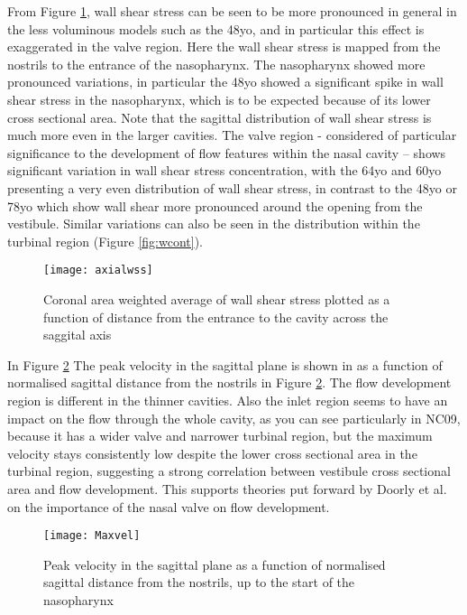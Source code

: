 From Figure \ref{fig:wax}, wall shear stress can be seen to be more pronounced in general in the less voluminous models such as the 48yo, and in particular this effect is exaggerated in the valve region. Here the wall shear stress is mapped from the nostrils to the entrance of the nasopharynx. The nasopharynx showed more pronounced variations, in particular the 48yo showed a significant spike in wall shear stress in the nasopharynx, which is to be expected because of its lower cross sectional area. Note that the sagittal distribution of wall shear stress is much more even in the larger cavities.  The valve region - considered of particular significance to the development of flow features within the nasal cavity \cite{Lindemann2008} – shows significant variation in wall shear stress concentration, with the 64yo and 60yo presenting a very even distribution of wall shear stress, in contrast to the 48yo or 78yo which show wall shear more pronounced around the opening from the vestibule. Similar variations can also be seen in the distribution within the turbinal region (Figure \ref{fig:wcont}). 

\begin{figure} 
  \texttt{[image: axialwss]}
  \caption{Coronal area weighted average of wall shear stress plotted as a function of distance from the entrance to the cavity across the saggital axis}
  \label{fig:wax}
\end{figure}

In Figure \ref{fig:peakvel} The peak velocity in the sagittal plane is shown in as a function of normalised sagittal distance from the nostrils in Figure \ref{fig:peakvel}. The flow development region is different in the thinner cavities. Also the inlet region seems to have an impact on the flow through the whole cavity, as you can see particularly in NC09, because it has a wider valve and narrower turbinal region, but the maximum velocity stays consistently low despite the lower cross sectional area in the turbinal region, suggesting a strong correlation between vestibule cross sectional area and flow development. This supports theories put forward by Doorly et al. \cite{Doorly2008c} on the importance of the nasal valve on flow development.

\begin{figure} 
  \texttt{[image: Maxvel]}
  \caption{Peak velocity in the sagittal plane as a function of normalised sagittal distance from the nostrils, up to the start of the nasopharynx}
  \label{fig:peakvel}
\end{figure}

